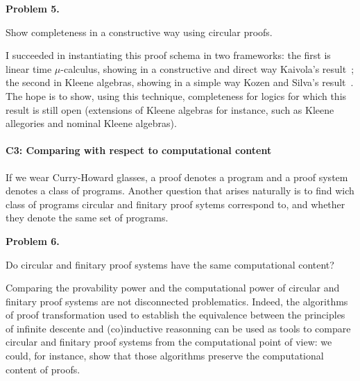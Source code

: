 \documentclass[11pt,twocolumn]{article}
\begin{document}
\begin{center}
\begin{bclogo}[logo= ,arrondi = 0.1, couleur = green!10,  epBarre = 0]{}
  \vspace{-10pt}
  \textbf{Problem 5.}

Show completeness in a constructive way using circular proofs.
\end{bclogo}
\end{center}

I succeeded in instantiating this proof schema in two  frameworks: the first is  linear time $\mu$-calculus, showing in a constructive and direct way Kaivola's result~\cite{}; the second in Kleene algebras, showing in a simple way Kozen and Silva's result~\cite{}. The hope is to show, using this technique, completeness for logics for which this result is still open (extensions of Kleene algebras for instance, such as Kleene allegories and nominal Kleene
algebras).


\paragraph{C3: Comparing with respect to computational content}

If we wear Curry-Howard glasses, a proof denotes a program and a proof system denotes a class
of programs. Another question that arises naturally is to find wich class of programs circular and finitary proof sytems correspond to, and whether they denote the same set of programs.

\begin{center}
\begin{bclogo}[logo= ,arrondi = 0.1, couleur = green!10,  epBarre = 0]{}
  \vspace{-10pt}
  \textbf{Problem 6.}

Do circular and finitary proof systems have the same computational content?
\end{bclogo}
\end{center}

Comparing the provability power and the computational power of  circular and finitary proof systems are not disconnected problematics. Indeed, the algorithms of proof transformation used to establish the equivalence between the principles of infinite descente and (co)inductive reasonning can be used as tools to compare circular and finitary proof systems from the computational point of view: we could, for instance, show that those algorithms preserve the computational content of proofs.
\end{document}
